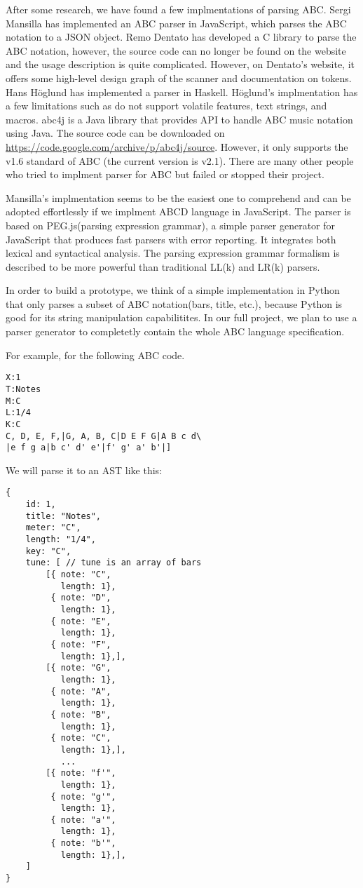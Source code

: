 After some research, we have found a few implmentations of parsing ABC. Sergi Mansilla has implemented an ABC parser in JavaScript, which parses the ABC notation to a JSON object\cite{Mansilla12}. Remo Dentato has developed a C library to parse the ABC notation\cite{Dentato09}, however, the source code can no longer be found on the website and the usage description is quite complicated. However, on Dentato's website, it offers some high-level design graph of the scanner and documentation on tokens. Hans H\"{o}glund has implemented a parser in Haskell\cite{Hoglund15}. H\"{o}glund's implmentation has a few limitations such as do not support volatile features, text strings, and macros. abc4j is a Java library that provides API to handle ABC music notation using Java. The source code can be downloaded on \url{https://code.google.com/archive/p/abc4j/source}. However, it only supports the v1.6 standard of ABC (the current version is v2.1). There are many other people who tried to implment parser for ABC but failed or stopped their project.

Mansilla's implmentation seems to be the easiest one to comprehend and can be adopted effortlessly if we implment ABCD language in JavaScript. The parser is based on PEG.js(parsing expression grammar), a simple parser generator for JavaScript that produces fast parsers with error reporting\cite{Ryuu17}. It integrates both lexical and syntactical analysis. The parsing expression grammar formalism is described to be more powerful than traditional LL(k) and LR(k) parsers.

In order to build a prototype, we think of a simple implementation in Python that only parses a subset of ABC notation(bars, title, etc.), because Python is good for its string manipulation capabilitites. In our full project, we plan to use a parser generator to completetly contain the whole ABC language specification. 

For example, for the following ABC code.
\begin{verbatim}
X:1
T:Notes
M:C
L:1/4
K:C
C, D, E, F,|G, A, B, C|D E F G|A B c d\
|e f g a|b c' d' e'|f' g' a' b'|]
\end{verbatim}

We will parse it to an AST like this:
\begin{verbatim}
{
	id: 1,
	title: "Notes",
	meter: "C",
	length: "1/4",
	key: "C",
	tune: [ // tune is an array of bars
	    [{ note: "C",
	       length: 1},
	     { note: "D",
	       length: 1},
	     { note: "E",
	       length: 1},
	     { note: "F",
	       length: 1},],
	    [{ note: "G",
	       length: 1},
	     { note: "A",
	       length: 1},
	     { note: "B",
	       length: 1},
	     { note: "C",
	       length: 1},],
	       ...
	    [{ note: "f'",
	       length: 1},
	     { note: "g'",
	       length: 1},
	     { note: "a'",
	       length: 1},
	     { note: "b'",
	       length: 1},],
	]
}
\end{verbatim}

